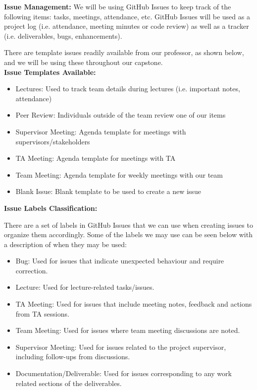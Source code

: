 \documentclass{article}
\begin{document}
\begin{itemize}
\textbf{Issue Management:}
We will be using GitHub Issues to keep track of the following items: tasks, meetings, attendance, etc. GitHub Issues will be used as a project log (i.e. attendance, meeting minutes or code review) as well as a tracker (i.e. deliverables, bugs, enhancements).


There are template issues readily available from our professor, as shown below, and we will be using these throughout our capstone. \\


\textbf{Issue Templates Available:}

\begin{itemize}
  \item Lectures: Used to track team details during lectures (i.e. important notes, attendance)
  \item Peer Review: Individuals outside of the team review one of our items
  \item Supervisor Meeting: Agenda template for meetings with supervisors/stakeholders
  \item TA Meeting: Agenda template for meetings with TA
  \item Team Meeting: Agenda template for weekly meetings with our team
  \item Blank Issue: Blank template to be used to create a new issue \\
\end{itemize}

\textbf{Issue Labels Classification:}

There are a set of labels in GitHub Issues that we can use when creating issues to organize them accordingly. Some of the labels we may use can be seen below with a description of when they may be used:

\begin{itemize}
  \item Bug: Used for issues that indicate unexpected behaviour and require correction.
  \item Lecture: Used for lecture-related tasks/issues.
  \item TA Meeting: Used for issues that include meeting notes, feedback and actions from TA sessions.
  \item Team Meeting: Used for issues where team meeting discussions are noted.
  \item Supervisor Meeting: Used for issues related to the project supervisor, including follow-ups from discussions.
  \item Documentation/Deliverable: Used for issues corresponding to any work related sections of the deliverables.
\end{itemize}


\end{itemize}
\end{document}
